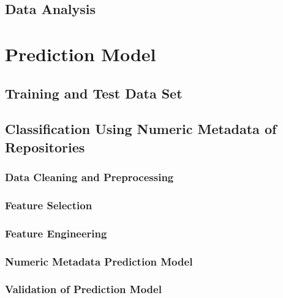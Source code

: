 \documentclass[%
a4paper,
DIV12,
2.5headlines,
bigheadings,
titlepage,
openbib,
]{scrartcl}
\begin{document}
\subsection{Data Analysis}\label{data-analysis}



\section{Prediction Model}\label{prediction-model}



\subsection{Training and Test Data
Set}\label{training-and-test-data-set}



\subsection{Classification Using Numeric Metadata of
Repositories}\label{classification-using-numeric-metadata-of-repositories}


\subsubsection{Data Cleaning and
Preprocessing}\label{data-cleaning-and-preprocessing}



\subsubsection{Feature Selection}\label{feature-selection}



\subsubsection{Feature Engineering}\label{feature-engineering}



\subsubsection{Numeric Metadata Prediction
Model}\label{numeric-metadata-prediction-model}



\subsubsection{Validation of Prediction
Model}\label{validation-of-prediction-model}
\end{document}
